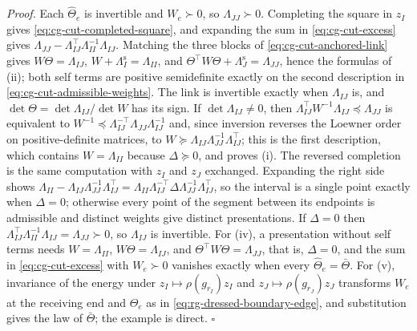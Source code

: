 \noindent\emph{Proof.}
Each $\widehat\Theta_e$ is invertible and $W_e\succ0$, so $\Lambda_{JJ}\succ0$. Completing the square in
$z_I$ gives \eqref{eq:cg-cut-completed-square}, and expanding the sum in \eqref{eq:cg-cut-excess} gives
$\Lambda_{JJ}-\Lambda_{IJ}^\top\Lambda_{II}^{-1}\Lambda_{IJ}$. Matching the three blocks of
\eqref{eq:cg-cut-anchored-link} gives $W\Theta=\Lambda_{IJ}$, $W+\Lambda^{\mathrm s}_I=\Lambda_{II}$, and
$\Theta^\top W\Theta+\Lambda^{\mathrm s}_J=\Lambda_{JJ}$, hence the formulas of (ii); both self terms are
positive semidefinite exactly on the second description in \eqref{eq:cg-cut-admissible-weights}. The link
is invertible exactly when $\Lambda_{IJ}$ is, and $\det\Theta=\det\Lambda_{IJ}/\det W$ has its sign. If
$\det\Lambda_{IJ}\neq0$, then $\Lambda_{IJ}^\top W^{-1}\Lambda_{IJ}\preceq\Lambda_{JJ}$ is equivalent to
$W^{-1}\preceq\Lambda_{IJ}^{-\top}\Lambda_{JJ}\Lambda_{IJ}^{-1}$ and, since inversion reverses the Loewner
order on positive-definite matrices, to $W\succeq\Lambda_{IJ}\Lambda_{JJ}^{-1}\Lambda_{IJ}^\top$; this is the
first description, which contains $W=\Lambda_{II}$ because $\Delta\succeq0$, and proves (i). The reversed
completion is the same computation with $z_I$ and $z_J$ exchanged. Expanding the right side shows
$\Lambda_{II}-\Lambda_{IJ}\Lambda_{JJ}^{-1}\Lambda_{IJ}^\top=\Lambda_{II}\Lambda_{IJ}^{-\top}\Delta\Lambda_{JJ}^{-1}\Lambda_{IJ}^\top$,
so the interval is a single point exactly when $\Delta=0$; otherwise every point of the segment between
its endpoints is admissible and distinct weights give distinct presentations. If $\Delta=0$ then
$\Lambda_{IJ}^\top\Lambda_{II}^{-1}\Lambda_{IJ}=\Lambda_{JJ}\succ0$, so $\Lambda_{IJ}$ is invertible. For (iv),
a presentation without self terms needs $W=\Lambda_{II}$, $W\Theta=\Lambda_{IJ}$, and
$\Theta^\top W\Theta=\Lambda_{JJ}$, that is, $\Delta=0$, and the sum in \eqref{eq:cg-cut-excess} with
$W_e\succ0$ vanishes exactly when every $\widehat\Theta_e=\bar\Theta$. For (v), invariance of the energy
under $z_I\mapsto\rho(g_{r_I})z_I$ and $z_J\mapsto\rho(g_{r_J})z_J$ transforms $W_e$ at the receiving end
and $\widehat\Theta_e$ as in \eqref{eq:rg-dressed-boundary-edge}, and substitution gives the law of
$\bar\Theta$; the example is direct. $\square$

